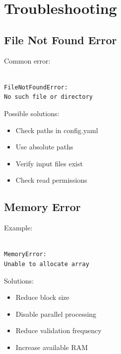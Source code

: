 \documentclass[11pt,a4paper]{article}
\begin{document}
\section{Troubleshooting}



\subsection{File Not Found Error}



Common error:



\begin{verbatim}

FileNotFoundError:
No such file or directory

\end{verbatim}



Possible solutions:


\begin{itemize}

\item Check paths in config.yaml

\item Use absolute paths

\item Verify input files exist

\item Check read permissions

\end{itemize}




\subsection{Memory Error}



Example:


\begin{verbatim}

MemoryError:
Unable to allocate array

\end{verbatim}



Solutions:


\begin{itemize}

\item Reduce block size

\item Disable parallel processing

\item Reduce validation frequency

\item Increase available RAM

\end{itemize}
\end{document}
